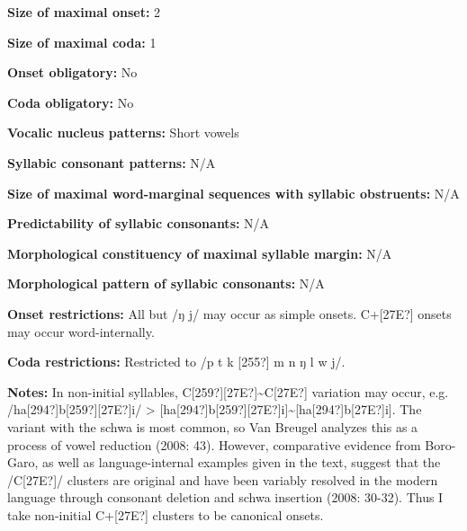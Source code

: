 \begin{styleBody}
\textbf{Size of maximal onset:} 2
\end{styleBody}

\begin{styleBody}
\textbf{Size of maximal coda: }1
\end{styleBody}

\begin{styleBody}
\textbf{Onset obligatory:} No
\end{styleBody}

\begin{styleBody}
\textbf{Coda obligatory:} No
\end{styleBody}

\begin{styleBody}
\textbf{Vocalic nucleus patterns: }Short vowels
\end{styleBody}

\begin{styleBody}
\textbf{Syllabic consonant patterns:} N/A
\end{styleBody}

\begin{styleBody}
\textbf{Size of maximal word{}-marginal sequences with syllabic obstruents:} N/A
\end{styleBody}

\begin{styleBody}
\textbf{Predictability of syllabic consonants:} N/A
\end{styleBody}

\begin{styleBody}
\textbf{Morphological constituency of maximal syllable margin:} N/A
\end{styleBody}

\begin{styleBody}
\textbf{Morphological pattern of syllabic consonants:} N/A
\end{styleBody}

\begin{styleBody}
\textbf{Onset restrictions:} All but /ŋ j/ may occur as simple onsets. C+[27E?] onsets may occur word-internally.
\end{styleBody}

\begin{styleBody}
\textbf{Coda restrictions:} Restricted to /p t k [255?] m n ŋ l w j/. 
\end{styleBody}

\begin{styleBody}
\textbf{Notes:} In non-initial syllables, C[259?][27E?]\~{}C[27E?] variation may occur, e.g. /ha[294?]b[259?][27E?]i/ {\textgreater} [ha[294?]b[259?][27E?]i]\~{}[ha[294?]b[27E?]i]. The variant with the schwa is most common, so Van Breugel analyzes this as a process of vowel reduction (2008: 43). However, comparative evidence from Boro-Garo, as well as language-internal examples given in the text, suggest that the /C[27E?]/ clusters are original and have been variably resolved in the modern language through consonant deletion and schwa insertion (2008: 30-32). Thus I take non-initial C+[27E?] clusters to be canonical onsets.
\end{styleBody}


